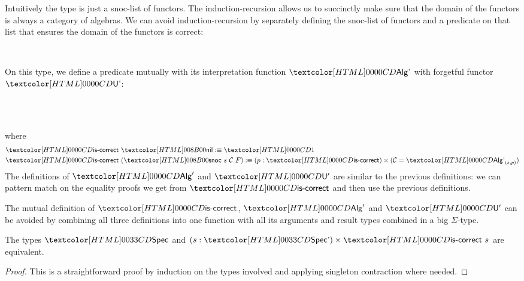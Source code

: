 Intuitively the type is just a snoc-list of functors. The
induction-recursion allows us to succinctly make sure that the domain
of the functors is always a category of algebras. We can avoid
induction-recursion by separately defining the snoc-list of functors
and a predicate on that list that ensures the domain of the functors
is correct:

\begin{definition}
  \begin{datatype}{\specaltty}{\Set}
    \constr{\specaltnil}{\specaltty} \\
    \constr{\specaltsnoc}{\specaltty \to (\Cc : \Cat)\ (\Func{\Cc}{\SET}) \to \specaltty}
  \end{datatype}
  On this type, we define a predicate mutually with its interpretation
  function $\Algalt$ with forgetful functor $\Undalt$:
  \begin{sorts}
    \functy{\specaltiscorrect}{\specaltty \to \Set} \\
     \\
  \end{sorts}
  where
  \begin{align*}
    &\specaltiscorrect\ \specaltnil \ddefeq \unitty \\
    &\specaltiscorrect\ (\specaltsnoc\ s\ \Cc\ F) \ddefeq (p : \specaltiscorrect) \times (\Cc = \Algalt_{(s,p)})
  \end{align*}
  The definitions of $\Alg'$ and $\Und'$ are similar to the previous
  definitions: we can pattern match on the equality proofs we get from
  $\specaltiscorrect$ and then use the previous definitions.
\end{definition}

\begin{remark}
  The mutual definition of $\specaltiscorrect$, $\Alg'$ and $\Und'$
  can be avoided by combining all three definitions into one function
  with all its arguments and result types combined in a big
  $\Sigma$-type.
\end{remark}

\begin{proposition}
  The types $\specty$ and $(s : \specaltty) \times \specaltiscorrect\ s$ are equivalent.
\end{proposition}

\begin{proof}
  This is a straightforward proof by induction on the types involved
  and applying singleton contraction where needed.
\end{proof}

